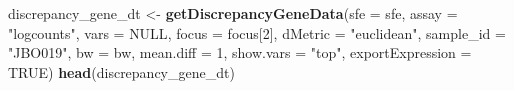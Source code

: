 \documentclass[
]{book}
\newenvironment{Shaded}{\begin{snugshade}}{\end{snugshade}}
\newcommand{\AttributeTok}[1]{\textcolor[rgb]{0.13,0.29,0.53}{#1}}
\newcommand{\ConstantTok}[1]{\textcolor[rgb]{0.56,0.35,0.01}{#1}}
\newcommand{\DecValTok}[1]{\textcolor[rgb]{0.00,0.00,0.81}{#1}}
\newcommand{\FunctionTok}[1]{\textcolor[rgb]{0.13,0.29,0.53}{\textbf{#1}}}
\newcommand{\NormalTok}[1]{#1}
\newcommand{\OtherTok}[1]{\textcolor[rgb]{0.56,0.35,0.01}{#1}}
\newcommand{\StringTok}[1]{\textcolor[rgb]{0.31,0.60,0.02}{#1}}
\begin{document}
\begin{Shaded}
\begin{Highlighting}[]
\NormalTok{discrepancy\_gene\_dt }\OtherTok{\textless{}{-}} \FunctionTok{getDiscrepancyGeneData}\NormalTok{(}\AttributeTok{sfe =}\NormalTok{ sfe,}
                                              \AttributeTok{assay =} \StringTok{"logcounts"}\NormalTok{,}
                                              \AttributeTok{vars =} \ConstantTok{NULL}\NormalTok{,}
                                              \AttributeTok{focus =}\NormalTok{ focus[}\DecValTok{2}\NormalTok{],}
                                              \AttributeTok{dMetric =} \StringTok{"euclidean"}\NormalTok{, }
                                              \AttributeTok{sample\_id =} \StringTok{"JBO019"}\NormalTok{,}
                                              \AttributeTok{bw =}\NormalTok{ bw, }
                                              \AttributeTok{mean.diff =} \DecValTok{1}\NormalTok{, }
                                              \AttributeTok{show.vars =} \StringTok{"top"}\NormalTok{,}
                                              \AttributeTok{exportExpression =} \ConstantTok{TRUE}\NormalTok{)}
\FunctionTok{head}\NormalTok{(discrepancy\_gene\_dt)}
\end{Highlighting}
\end{Shaded}
\end{document}
